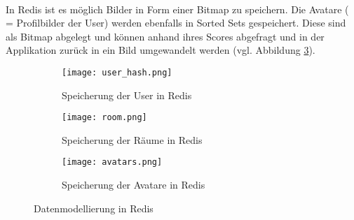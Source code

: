\\In \acs{Redis} ist es möglich Bilder in Form einer Bitmap zu speichern. Die Avatare ( = Profilbilder der User) werden ebenfalls in Sorted Sets gespeichert. Diese sind als Bitmap abgelegt und können anhand ihres Scores abgefragt und in der Applikation zurück in ein Bild umgewandelt werden (vgl. Abbildung \ref{fig:sub3}).
\begin{figure}[h]
	\centering
	
	\begin{subfigure}{0.3\textwidth}
		\centering
		\texttt{[image: user\_hash.png]}
		\caption{Speicherung der User in \acs{Redis}}
		\label{fig:sub1}
	\end{subfigure}%
	\hspace{0.02\textwidth}
	\begin{subfigure}{0.3\textwidth}
		\centering
		\texttt{[image: room.png]}
		\caption{Speicherung der Räume in \acs{Redis}}
		\label{fig:sub2}
	\end{subfigure}%
	\hspace{0.02\textwidth}
	\begin{subfigure}{0.3\textwidth}
		\centering
		\texttt{[image: avatars.png]}
		\caption{Speicherung der Avatare in \acs{Redis}}
		\label{fig:sub3}
	\end{subfigure}
	
	\caption{Datenmodellierung in \acs{Redis}}
	\label{fig:overall}
\end{figure}